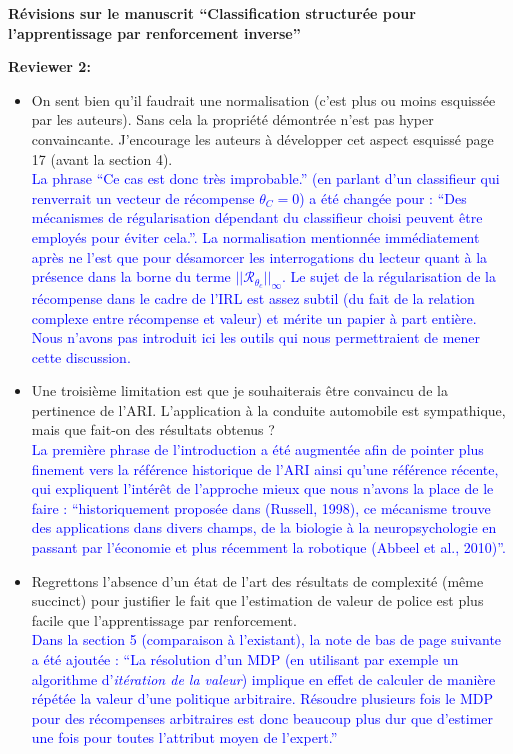 \documentclass[11pt, a4paper]{letter}
\newcommand{\R}{\mathcal{R}}
\begin{document}
\begin{letter}{\large \textbf{Révisions sur le manuscrit ``Classification structurée pour l'apprentissage par renforcement inverse''}}
\newpage
\begin{large} \textbf{Reviewer 2:} \\ \end{large}
\begin{itemize}
\item  On sent bien qu'il faudrait une normalisation (c'est plus ou moins esquissée par les auteurs). Sans cela la
propriété démontrée n'est pas hyper convaincante. J'encourage les auteurs à développer cet aspect esquissé page
17 (avant la section 4).\\
\textcolor{blue}{La phrase ``Ce cas est donc très improbable.'' (en parlant d'un classifieur qui renverrait un vecteur de récompense $\theta_C=0$) a été changée pour : ``Des mécanismes de régularisation dépendant du classifieur choisi peuvent être employés pour éviter cela.''. La normalisation mentionnée immédiatement après ne l'est que pour désamorcer les interrogations du lecteur quant à la présence dans la borne du terme $||\R_{\theta_c}||_\infty$. Le sujet de la régularisation de la récompense dans le cadre de l'IRL est assez subtil (du fait de la relation complexe entre récompense et valeur) et mérite un papier à part entière. Nous n'avons pas introduit ici les outils qui nous permettraient de mener cette discussion.}
\item Une troisième limitation est que je souhaiterais être convaincu de la pertinence de l'ARI. L'application à la conduite automobile est sympathique, mais que fait-on des résultats obtenus ?\\
  \textcolor{blue}{La première phrase de l'introduction a été augmentée afin de pointer plus finement vers la référence historique de l'ARI ainsi qu'une référence récente, qui expliquent l'intérêt de l'approche mieux que nous n'avons la place de le faire : ``historiquement proposée dans (Russell, 1998),
ce mécanisme trouve des applications dans divers champs, de la biologie à la neuropsychologie en passant par l’économie et plus récemment la robotique (Abbeel et al., 2010)''.}
\item Regrettons l'absence d'un état de l'art des résultats de complexité (même succinct) pour justifier le fait que l'estimation de valeur de police est plus facile que l'apprentissage par renforcement. \\
  \textcolor{blue}{Dans la section 5 (comparaison à l'existant), la note de bas de page suivante a été ajoutée : ``La résolution d'un MDP (en utilisant par exemple un algorithme d'\emph{itération de la valeur}) implique en effet de calculer de manière répétée la valeur d'une politique arbitraire. Résoudre plusieurs fois le MDP pour des récompenses arbitraires est donc beaucoup plus dur que d'estimer une fois pour toutes l'attribut moyen de l'expert.''}

\end{itemize}
\end{letter}
\end{document}
